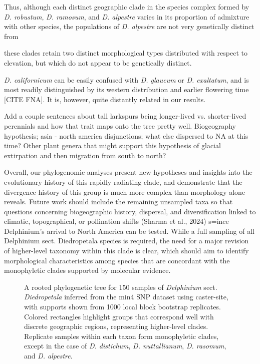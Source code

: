 \documentclass[11pt]{article}
\newcommand{\beginsupplement}{%
	\setcounter{table}{0}
	\setcounter{figure}{0}
	\renewcommand{\thetable}{S\arabic{table}}%
	\renewcommand{\thefigure}{S\arabic{figure}}%
}
\begin{document}
Thus, although each distinct geographic clade in the species complex formed by 
\emph{D. robustum}, \emph{D. ramosum}, and \emph{D. alpestre} varies in its
proportion of admixture with other species, the populations of \emph{D. alpestre}
are not very genetically distinct from 

these clades retain two distinct
morphological types distributed with respect to elevation, but which do not
appear to be genetically distinct. 
% 


\emph{D. californicum} can be easily confused with \emph{D. glaucum} or \emph{D. exaltatum}, and
is most readily distinguished by its western distribution and earlier flowering time [CITE FNA]. 
It is, however, quite distantly related in our results.

Add a couple sentences about tall larkspurs being longer-lived vs. shorter-lived perennials and how that trait maps onto the tree pretty well.
Biogeography hypothesis; asia - north america disjunctions; what else dispersed to NA at this time? Other plant genera that might support this hypothesis of glacial extirpation and then migration from south to north?


Overall, our phylogenomic analyses present new hypotheses and insights into the evolutionary history of this rapidly radiating clade, and demonstrate that the divergence history of this group is much more complex than morphology alone reveals. Future work should include the remaining unsampled taxa so that questions concerning biogeographic history, dispersal, and diversification linked to climatic, topographical, or pollination shifts (Sharma et al., 2024) s=ince Delphinium’s arrival to North America can be tested. While a full sampling of all Delphinium sect. Diedropetala species is required, the need for a major revision of higher-level taxonomy within this clade is clear, which should aim to identify morphological characteristics among species that are concordant with the monophyletic clades supported by molecular evidence.



  



\beginsupplement

\begin{figure}[p]
	\centering
	\caption{
		A rooted phylogenetic tree for 150 samples of \emph{Delphinium} sect. \emph{Diedropetala}
		inferred from the min4 SNP dataset using caster-site, with supports shown from
		1000 local block bootstrap replicates. 
		Colored rectangles highlight
		groups that correspond well with discrete geographic regions, representing higher-level 
		clades. Replicate samples within each taxon form monophyletic clades, except in the case
		of \emph{D. distichum}, \emph{D. nuttallianum}, \emph{D. rasomum}, and \emph{D. alpestre}.
	}
	\label{fig:S1}
\end{figure}
\end{document}
